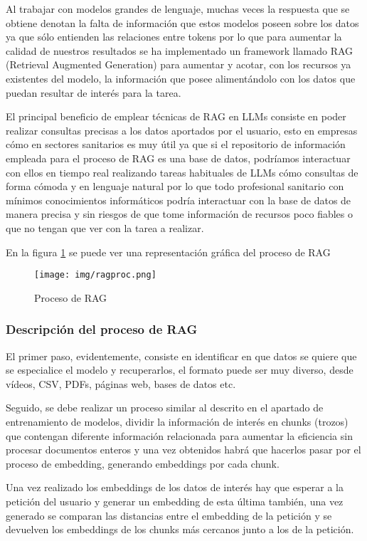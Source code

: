 Al trabajar con modelos grandes de lenguaje, muchas veces la respuesta que se obtiene denotan la falta de información que estos modelos poseen sobre los datos ya que sólo entienden las relaciones entre tokens por lo que para aumentar la calidad de nuestros resultados se ha implementado un framework llamado RAG (Retrieval Augmented Generation) para aumentar y acotar, con los recursos ya existentes del modelo, la información que posee alimentándolo con los datos que puedan resultar de interés para la tarea.

El principal beneficio de emplear técnicas de RAG en LLMs consiste en poder realizar consultas precisas a los datos aportados por el usuario, esto en empresas cómo en sectores sanitarios es muy útil ya que si el repositorio de información empleada para el proceso de RAG es una base de datos, podríamos interactuar con ellos en tiempo real realizando tareas habituales de LLMs cómo consultas de forma cómoda y en lenguaje natural por lo que todo profesional sanitario con mínimos conocimientos informáticos podría interactuar con la base de datos de manera precisa y sin riesgos de que tome información de recursos poco fiables o que no tengan que ver con la tarea a realizar.

En la figura \ref{fig:ragrpoc} se puede ver una representación gráfica del proceso de RAG

\begin{figure}[h]
    \centering
    \texttt{[image: img/ragproc.png]}
    \caption{Proceso de RAG}
    \label{fig:ragrpoc}
\end{figure}


\subsubsection{Descripción del proceso de RAG}

El primer paso, evidentemente, consiste en identificar en que datos se quiere que se especialice el modelo y recuperarlos, el formato puede ser muy diverso, desde vídeos, CSV, PDFs, páginas web, bases de datos etc.

Seguido, se debe realizar un proceso similar al descrito en el apartado de entrenamiento de modelos, dividir la información de interés en chunks (trozos) que contengan diferente información relacionada para aumentar la eficiencia sin procesar documentos enteros y una vez obtenidos habrá que hacerlos pasar por el proceso de embedding, generando embeddings por cada chunk.

Una vez realizado los embeddings de los datos de interés hay que esperar a la petición del usuario y generar un embedding de esta última también, una vez generado se comparan las distancias entre el embedding de la petición y se devuelven los embeddings de los chunks más cercanos junto a los de la petición.

